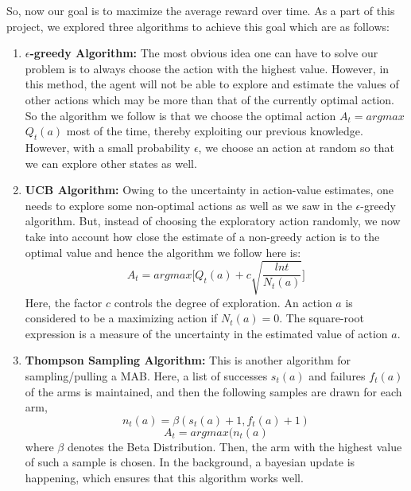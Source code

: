 \documentclass[12pt]{article}
\begin{document}
\noindent
 So, now our goal is to maximize the average reward over time. As a part of this project, we explored three algorithms to achieve this goal which are as follows:
 \newpage
 \begin{enumerate}
     \item \textbf{$\epsilon$-greedy Algorithm:} The most obvious idea one can have to solve our problem is to always choose the action with the highest value. However, in this method, the agent will not be able to explore and estimate the values of other actions which may be more than that of the currently optimal action. So the algorithm we follow is that we choose the optimal action $A_{t}=argmax$ $Q_{t}(a)$ most of the time, thereby exploiting our previous knowledge. However, with a small probability $\epsilon$, we choose an action at random so that we can explore other states as well.

     \item \textbf{UCB Algorithm:} Owing to the uncertainty in action-value estimates, one needs to explore some non-optimal actions as well as we saw in the $\epsilon$-greedy algorithm. But, instead of choosing the exploratory action randomly, we now take into account how close the estimate of a non-greedy action is to the optimal value and hence the algorithm we follow here is:
     \begin{equation}
         A_{t}=argmax  \Biggr[ Q_{t}(a)+c\sqrt{\frac{lnt}{N_{t}(a)}}\Biggr]
     \end{equation}
     Here, the factor $c$ controls the degree of exploration. An action $a$ is considered to be a maximizing action if $N_{t}(a)=0$. The square-root expression is a measure of the uncertainty in the estimated value of action $a$.

     \item \textbf{Thompson Sampling Algorithm:} This is another algorithm for sampling/pulling a MAB. Here, a list of successes $s_{t}(a)$ and failures $f_{t}(a)$
 of the arms is maintained, and then the following samples are drawn for each arm,
 \begin{equation}
     n_{t}(a)=\beta(s_{t}(a)+1,f_{t}(a)+1)
\end{equation}
\begin{equation}
    A_{t}=argmax(n_{t}(a)
\end{equation}
where $\beta$ denotes the Beta Distribution. Then, the arm with the highest value of such a sample is chosen. In the background, a bayesian update is happening, which ensures that this algorithm works well.

 \end{enumerate}
\end{document}
